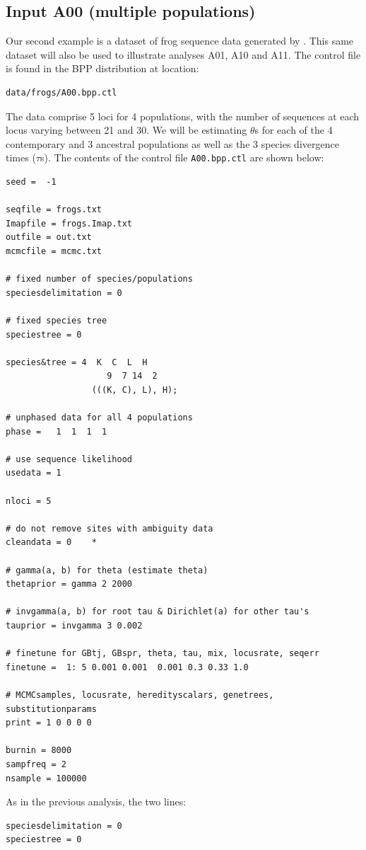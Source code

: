 \documentclass[a4paper]{book}
\numberwithin{equation}{section} \renewcommand{\baselinestretch}{0.55}
\begin{document}
\subsection{Input A00 (multiple populations)}
Our second example is a dataset of frog sequence data generated by \cite{Zhou2012}.
This same dataset will also be used to illustrate analyses A01, A10 and A11.
The control file is found in the BPP distribution at location:
\begin{verbatim}
data/frogs/A00.bpp.ctl
\end{verbatim}
The data comprise 5 loci for 4 populations, with the number of sequences at each locus varying
between 21 and 30. We will be estimating $\theta$s for each of the 4 contemporary and 3 ancestral populations
as well as the 3 species divergence times ($\tau$s). The contents of the control file
\texttt{A00.bpp.ctl} are shown below:
{\small
\begin{verbatim}
seed =  -1

seqfile = frogs.txt
Imapfile = frogs.Imap.txt
outfile = out.txt
mcmcfile = mcmc.txt

# fixed number of species/populations
speciesdelimitation = 0 

# fixed species tree
speciestree = 0

species&tree = 4  K  C  L  H
                    9  7 14  2
                 (((K, C), L), H);

# unphased data for all 4 populations
phase =   1  1  1  1

# use sequence likelihood                  
usedata = 1

nloci = 5  

# do not remove sites with ambiguity data
cleandata = 0    * 

# gamma(a, b) for theta (estimate theta)
thetaprior = gamma 2 2000 

# invgamma(a, b) for root tau & Dirichlet(a) for other tau's
tauprior = invgamma 3 0.002 

# finetune for GBtj, GBspr, theta, tau, mix, locusrate, seqerr
finetune =  1: 5 0.001 0.001  0.001 0.3 0.33 1.0  

# MCMCsamples, locusrate, heredityscalars, genetrees, substitutionparams
print = 1 0 0 0 0   

burnin = 8000
sampfreq = 2
nsample = 100000
\end{verbatim}
}
\noindent
As in the previous analysis, the two lines:
\begin{verbatim}
speciesdelimitation = 0 
speciestree = 0
\end{verbatim}
\end{document}
